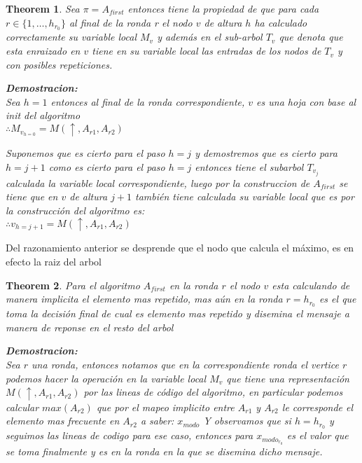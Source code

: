 \documentclass[11pt]{article}
\newtheorem{theorem}{Theorem}
\begin{document}
\begin{theorem}
Sea $ \pi = A_{first}$ entonces tiene la propiedad de que para cada $r \in \lbrace 1, \ldots, h_{r_{0}}  \rbrace $
al final de la ronda r el nodo $v$ de altura $h$ ha calculado correctamente su variable local $M_{v}$ y
además en el sub-arbol $T_{v}$ que denota que esta enraizado en $v$ tiene en su variable local las entradas de los nodos de $T_{v}$
y con posibles repeticiones.

    \textbf{Demostracion:} \\
Sea $h=1$ entonces al final de la ronda correspondiente, $v$ es una hoja con
base al init del algoritmo\\
$\therefore M_{v_{h=0}}= M(\uparrow, A_{r1}, A_{r2})$

Suponemos que es cierto para el paso $h=j$  y demostremos que es cierto para $h = j+1$
como es cierto para el paso $h =j$ entonces tiene el subarbol $T_{v_{j}}$ calculada la variable
local correspondiente, luego por la construccion de $A_{first}$ se tiene que en $v$ de altura $j+1$
también tiene calculada su variable local que es por la construcción del algoritmo es:
\\
$\therefore {v_{h = j+1}} = M(\uparrow, A_{r1}, A_{r2})$
\end{theorem}
Del razonamiento anterior se desprende que el nodo que calcula el máximo, es en efecto la raiz del arbol

\begin{theorem}
    Para el algoritmo $A_{first}$ en la ronda $r$ el nodo $v$ esta calculando de manera implicita el elemento mas repetido,
    mas aún en la ronda $r = h_{r_{0}}$ es el que toma la decisión final de cual es elemento mas repetido y disemina
    el mensaje a manera de reponse en el resto del arbol

    \textbf{Demostracion:}\\
    Sea $r$ una ronda, entonces notamos que en la correspondiente ronda el vertice $r$ podemos hacer la operación
    en la variable local $M_{v}$ que tiene una representación $M(\uparrow, A_{r1}, A_{r2})$ por las lineas de código del
    algoritmo, en particular  podemos calcular $max(A_{r2})$ que por el mapeo implicito entre $A_{r1}$ y $A_{r2}$ le corresponde
    el elemento mas frecuente en $A_{r2}$ a saber: $x_{modo}$
    Y observamos que si $h= h_{r_{0}}$ y seguimos las lineas de codigo para ese caso, entonces para $x_{modo_{r_0}}$ es el valor
    que se toma finalmente y es en la ronda en la que se disemina dicho mensaje.

\end{theorem}
\end{document}
